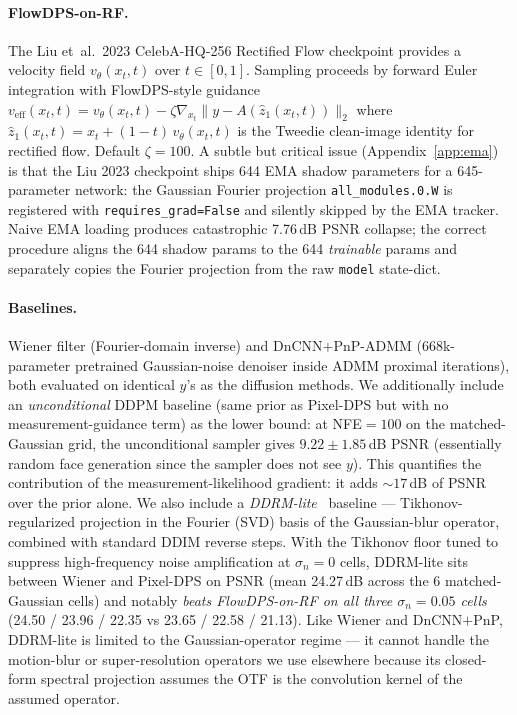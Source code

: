 \documentclass{article}
\begin{document}
\paragraph{FlowDPS-on-RF.} The Liu et~al.~2023 CelebA-HQ-256
Rectified Flow checkpoint provides a velocity field
$v_\theta(x_t, t)$ over $t \in [0,1]$. Sampling proceeds by forward
Euler integration with FlowDPS-style guidance
$v_{\text{eff}}(x_t, t) = v_\theta(x_t, t) - \zeta \nabla_{x_t}
\|y - A(\hat z_1(x_t, t))\|_2$
where $\hat z_1(x_t, t) = x_t + (1-t)\,v_\theta(x_t,t)$ is the
Tweedie clean-image identity for rectified flow. Default $\zeta{=}100$.
A subtle but critical issue (Appendix~\ref{app:ema}) is that the Liu
2023 checkpoint ships 644 EMA shadow parameters for a
645-parameter network: the Gaussian Fourier projection
\texttt{all\_modules.0.W} is registered with
\texttt{requires\_grad=False} and silently skipped by the EMA tracker.
Naive EMA loading produces catastrophic 7.76\,dB PSNR collapse;
the correct procedure aligns the 644 shadow params to the 644
\emph{trainable} params and separately copies the Fourier projection
from the raw \texttt{model} state-dict.

\paragraph{Baselines.} Wiener filter (Fourier-domain inverse) and
DnCNN$+$PnP-ADMM (668k-parameter pretrained Gaussian-noise denoiser
inside ADMM proximal iterations), both evaluated on identical $y$'s as
the diffusion methods. We additionally include an \emph{unconditional}
DDPM baseline (same prior as Pixel-DPS but with no
measurement-guidance term) as the lower bound: at NFE${=}100$ on the
matched-Gaussian grid, the unconditional sampler gives
$9.22 \pm 1.85$\,dB PSNR (essentially random face generation since the
sampler does not see $y$). This quantifies the contribution of the
measurement-likelihood gradient: it adds ${\sim}17$\,dB of PSNR over
the prior alone. We also include a \emph{DDRM-lite}~\citep{kawar2022ddrm}
baseline — Tikhonov-regularized projection in the Fourier (SVD)
basis of the Gaussian-blur operator, combined with standard DDIM
reverse steps. With the Tikhonov floor tuned to suppress
high-frequency noise amplification at $\sigma_n{=}0$ cells, DDRM-lite
sits between Wiener and Pixel-DPS on PSNR (mean 24.27\,dB across the
6 matched-Gaussian cells) and notably \emph{beats FlowDPS-on-RF on
all three $\sigma_n{=}0.05$ cells} (24.50 / 23.96 / 22.35 vs
23.65 / 22.58 / 21.13). Like Wiener and DnCNN$+$PnP, DDRM-lite is
limited to the Gaussian-operator regime — it cannot handle the
motion-blur or super-resolution operators we use elsewhere because
its closed-form spectral projection assumes the OTF is the
convolution kernel of the assumed operator.
\end{document}
